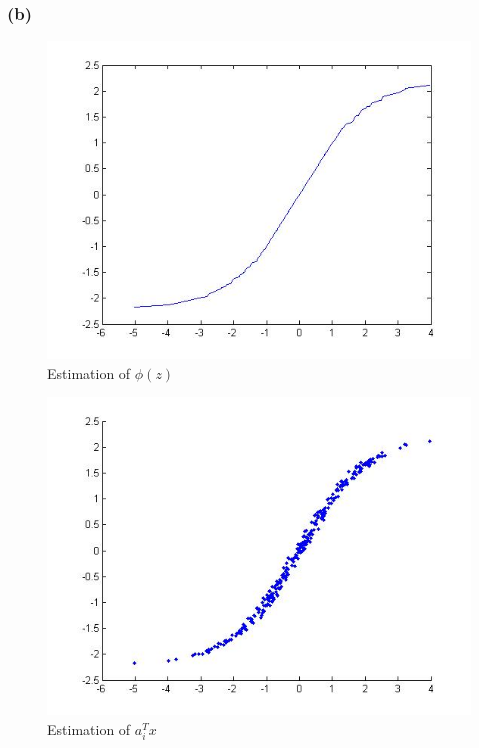 \subsubsection*{(b)} 

\begin{figure}
	\centering
	\includegraphics[scale=0.5]{z}
	\caption{Estimation of $\phi(z)$}
\end{figure}
\begin{figure}
	\centering
	\includegraphics[scale=0.5]{x}
	\caption{Estimation of $a_i^Tx$}
\end{figure}
